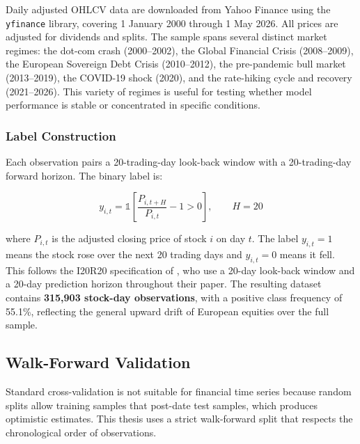 Daily adjusted OHLCV data are downloaded from Yahoo Finance using the \texttt{yfinance} library, covering 1 January 2000 through 1 May 2026. All prices are adjusted for dividends and splits. The sample spans several distinct market regimes: the dot-com crash (2000--2002), the Global Financial Crisis (2008--2009), the European Sovereign Debt Crisis (2010--2012), the pre-pandemic bull market (2013--2019), the COVID-19 shock (2020), and the rate-hiking cycle and recovery (2021--2026). This variety of regimes is useful for testing whether model performance is stable or concentrated in specific conditions.

\subsubsection{Label Construction}

Each observation pairs a 20-trading-day look-back window with a 20-trading-day forward horizon. The binary label is:

\begin{equation}
y_{i,t} = \mathbb{1}\!\left[\frac{P_{i,t+H}}{P_{i,t}} - 1 > 0\right], \qquad H = 20
\label{eq:label}
\end{equation}

where $P_{i,t}$ is the adjusted closing price of stock $i$ on day $t$. The label $y_{i,t} = 1$ means the stock rose over the next 20 trading days and $y_{i,t} = 0$ means it fell. This follows the I20R20 specification of \textcite{Jiang2023}, who use a 20-day look-back window and a 20-day prediction horizon throughout their paper. The resulting dataset contains \textbf{315,903 stock-day observations}, with a positive class frequency of 55.1\%, reflecting the general upward drift of European equities over the full sample.

\subsection{Walk-Forward Validation}
\label{sec:split}

Standard cross-validation is not suitable for financial time series because random splits allow training samples that post-date test samples, which produces optimistic estimates. This thesis uses a strict walk-forward split that respects the chronological order of observations.

